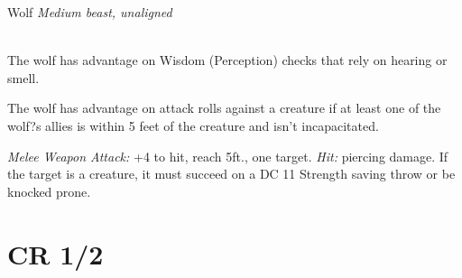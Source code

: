 \documentclass[10pt,twoside,twocolumn,openany]{book}
\begin{document}
\begin{monsterboxnobg}{Wolf}
	\textit{Medium beast, unaligned}\\
	\hline
	\basics[
		armorclass	= 13,
		hitpoints 		= \dice{2d8 + 2},
		speed		= {40 ft.}
	]
	\hline
	\stats[
		STR	= \stat{12},
		DEX	= \stat{15},
		CON	= \stat{12},
		INT	= \stat{3},
		WIS	= \stat{12},
		CHA	= \stat{6}
	]
	\hline
	\details[
		skills			= {Perception +3, Stealth +4},
		senses		= {passive Perception 13},
		languages		= {-},
		challenge		= 1/4
	]
	\hline \\[1mm]
	\begin{monsteraction}
		The wolf has advantage on Wisdom (Perception) checks that rely on hearing or smell.
	\end{monsteraction}
	
	\begin{monsteraction}
		The wolf has advantage on attack rolls against a creature if at least one of the wolf?s allies is within 5 feet of the creature and isn't incapacitated.
	\end{monsteraction}
	\begin{monsteraction}[Bite]
		\textit{Melee Weapon Attack:} +4 to hit, reach 5ft., one target. \textit{Hit:}  piercing damage. If the target is a creature, it must succeed on a DC 11 Strength saving throw or be knocked prone.
	\end{monsteraction}
\end{monsterboxnobg}
\newpage
\section{CR 1/2}
\end{document}
